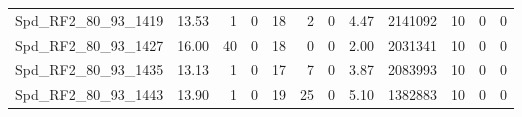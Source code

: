 \begin{longtable}[c]{@{}lrrrrrrrrrrr@{}}
Spd\_RF2\_80\_93\_1419        & 13.53                  & 1                       & 0                       & 18                     & 2                       & 0                       & 4.47                    & 2141092                  & 10                       & 0                        & 0                        \\
Spd\_RF2\_80\_93\_1427        & 16.00                  & 40                      & 0                       & 18                     & 0                       & 0                       & 2.00                    & 2031341                  & 10                       & 0                        & 0                        \\
Spd\_RF2\_80\_93\_1435        & 13.13                  & 1                       & 0                       & 17                     & 7                       & 0                       & 3.87                    & 2083993                  & 10                       & 0                        & 0                        \\
Spd\_RF2\_80\_93\_1443        & 13.90                  & 1                       & 0                       & 19                     & 25                      & 0                       & 5.10                    & 1382883                  & 10                       & 0                        & 0                        \\* \bottomrule
\end{longtable}